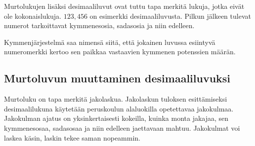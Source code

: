Murtolukujen lisäksi desimaaliluvut ovat tuttu tapa merkitä lukuja, jotka eivät ole kokonaislukuja. $123,456$ on esimerkki desimaaliluvusta. Pilkun jälkeen tulevat numerot tarkoittavat kymmenesosia, sadasosia ja niin edelleen.



Kymmenjärjestelmä saa nimensä siitä, että jokainen luvussa esiintyvä numeromerkki kertoo sen paikkaa vastaavien kymmenen potenssien määrän. %

\subsection{Murtoluvun muuttaminen desimaaliluvuksi}

Murtoluku on tapa merkitä jakolaskua. Jakolaskun tuloksen esittämiseksi desimaalilukuna käytetään peruskoulun alaluokilla opetettavaa jakokulmaa. Jakokulman ajatus on yksinkertaisesti kokeilla, kuinka monta jakajaa, sen kymmenesosaa, sadasosaa ja niin edelleen jaettavaan mahtuu. Jakokulmat voi laskea käsin, laskin tekee saman nopeammin.

